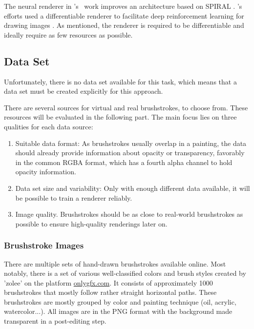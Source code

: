 The neural renderer in 's~\cite{japanese neural renderer} work improves an architecture based on SPIRAL \cite{SPIRAL}.
\citeauthor*{Learning2Paint}'s efforts used a differentiable renderer to facilitate deep reinforcement learning for drawing images \cite{Learning2Paint}.
As mentioned, the renderer is required to be differentiable and ideally require as few resources as possible.

\subsection{Data Set}

Unfortunately, there is no data set available for this task, which means that a data set must be created explicitly for this approach.

There are several sources for virtual and real brushstrokes, to choose from.
These resources will be evaluated in the following part.
The main focus lies on three qualities for each data source:
\begin{enumerate}
    \item Suitable data format: As brushstrokes usually overlap in a painting, the data should already provide information about opacity or transparency, favorably in the common RGBA format, which has a fourth alpha channel to hold opacity information.
    \item Data set size and variability: Only with enough different data available, it will be possible to train a renderer reliably.
    \item Image quality. Brushstrokes should be as close to real-world brushstrokes as possible to ensure high-quality renderings later on.
\end{enumerate}

\subsubsection{Brushstroke Images}

There are multiple sets of hand-drawn brushstrokes available online.
Most notably, there is a set of various well-classified colors and brush styles created by 'zolee'  on the platform \url{onlygfx.com}.
It consists of approximately 1000 brushstrokes that mostly follow rather straight horizontal paths.
These brushstrokes are mostly grouped by color and painting technique (oil, acrylic, watercolor...).
All images are in the PNG format with the background made transparent in a post-editing step.

